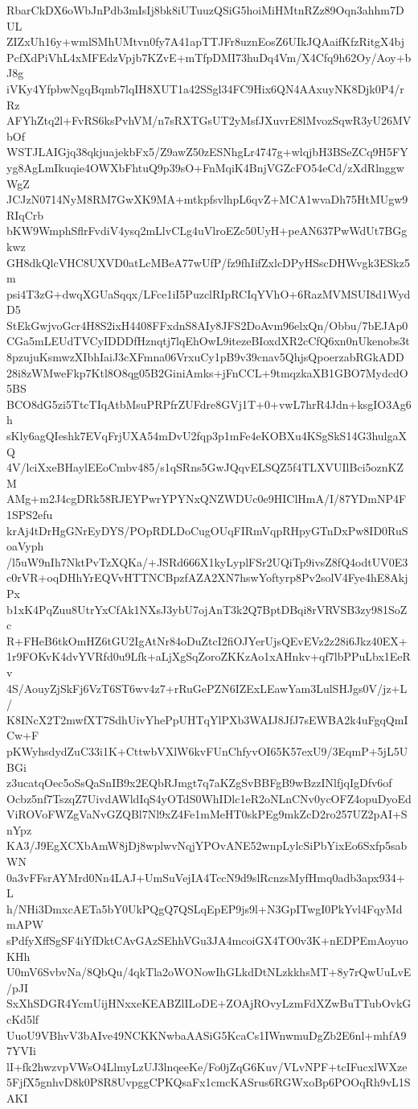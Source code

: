 RbarCkDX6oWbJnPdb3mIsIj8bk8iUTuuzQSiG5hoiMiHMtnRZz89Oqn3ahhm7DUL
ZIZxUh16y+wmlSMhUMtvn0fy7A41apTTJFr8uznEosZ6UIkJQAaifKfzRitgX4bj
PcfXdPiVhL4xMFEdzVpjb7KZvE+mTfpDMI73huDq4Vm/X4Cfq9h62Oy/Aoy+bJ8g
iVKy4YfpbwNgqBqmb7lqIH8XUT1a42SSgl34FC9Hix6QN4AAxuyNK8Djk0P4/rRz
AFYhZtq2l+FvRS6ksPvhVM/n7sRXTGsUT2yMsfJXuvrE8lMvozSqwR3yU26MVbOf
WSTJLAIGjq38qkjuajekbFx5/Z9awZ50zESNhgLr4747g+wlqjbH3BSeZCq9H5FY
yg8AgLmIkuqie4OWXbFhtuQ9p39sO+FnMqiK4BnjVGZcFO54eCd/zXdRlnggwWgZ
JCJzN0714NyM8RM7GwXK9MA+mtkpfsvlhpL6qvZ+MCA1wvaDh75HtMUgw9RIqCrb
bKW9WmphSflrFvdiV4ysq2mLlvCLg4uVlroEZc50UyH+peAN637PwWdUt7BGgkwz
GH8dkQlcVHC8UXVD0atLcMBeA77wUfP/fz9fhIifZxlcDPyHSscDHWvgk3ESkz5m
psi4T3zG+dwqXGUaSqqx/LFce1iI5PuzclRIpRCIqYVhO+6RazMVMSUI8d1WydD5
StEkGwjvoGcr4H8S2ixH4408FFxdnS8AIy8JFS2DoAvm96elxQn/Obbu/7bEJAp0
CGa5mLEUdTVCyIDDDfHznqtj7lqEhOwL9itezeBIoxdXR2cCfQ6xn0nUkenobs3t
8pzujuKsmwzXIbhIaiJ3cXFmna06VrxuCy1pB9v39cnav5QhjsQpoerzabRGkADD
28i8zWMweFkp7Ktl8O8qg05B2GiniAmks+jFnCCL+9tmqzkaXB1GBO7MydcdO5BS
BCO8dG5zi5TtcTIqAtbMsuPRPfrZUFdre8GVj1T+0+vwL7hrR4Jdn+ksgIO3Ag6h
sKly6agQIeshk7EVqFrjUXA54mDvU2fqp3p1mFe4eKOBXu4KSgSkS14G3hulgaXQ
4V/lciXxeBHaylEEoCmbv485/s1qSRns5GwJQqvELSQZ5f4TLXVUIlBci5oznKZM
AMg+m2J4cgDRk58RJEYPwrYPYNxQNZWDUc0e9HIClHmA/I/87YDmNP4F1SPS2efu
krAj4tDrHgGNrEyDYS/POpRDLDoCugOUqFIRmVqpRHpyGTnDxPw8ID0RuSoaVyph
/l5uW9nIh7NktPvTzXQKa/+JSRd666X1kyLyplFSr2UQiTp9ivsZ8fQ4odtUV0E3
c0rVR+oqDHhYrEQVvHTTNCBpzfAZA2XN7hswYoftyrp8Pv2solV4Fye4hE8AkjPx
b1xK4PqZuu8UtrYxCfAk1NXsJ3ybU7ojAnT3k2Q7BptDBqi8rVRVSB3zy981SoZc
R+FHeB6tkOmHZ6tGU2IgAtNr84oDuZtcI2fiOJYerUjsQEvEVz2z28i6Jkz40EX+
1r9FOKvK4dvYVRfd0u9Lfk+aLjXgSqZoroZKKzAo1xAHnkv+qf7lbPPuLbx1EeRv
4S/AouyZjSkFj6VzT6ST6wv4z7+rRuGePZN6IZExLEawYam3LulSHJgs0V/jz+L/
K8INcX2T2mwfXT7SdhUivYhePpUHTqYlPXb3WAIJ8JfJ7sEWBA2k4uFgqQmICw+F
pKWyhsdydZuC33i1K+CttwbVXlW6kvFUnChfyvOI65K57exU9/3EqmP+5jL5UBGi
z3ucatqOec5oSsQaSnIB9x2EQbRJmgt7q7aKZgSvBBFgB9wBzzINlfjqIgDfv6of
Ocbz5nf7TszqZ7UivdAWldIqS4yOTdS0WhIDlc1eR2oNLnCNv0ycOFZ4opuDyoEd
ViROVoFWZgVaNvGZQBl7Nl9xZ4Fe1mMeHT0skPEg9mkZcD2ro257UZ2pAI+SnYpz
KA3/J9EgXCXbAmW8jDj8wplwvNqjYPOvANE52wnpLylcSiPbYixEo6Sxfp5sabWN
0a3vFFsrAYMrd0Nn4LAJ+UmSuVejIA4TccN9d9slRcnzsMyfHmq0adb3apx934+L
h/NHi3DmxcAETa5bY0UkPQgQ7QSLqEpEP9js9l+N3GpITwgI0PkYvl4FqyMdmAPW
sPdfyXffSgSF4iYfDktCAvGAzSEhhVGu3JA4mcoiGX4TO0v3K+nEDPEmAoyuoKHh
U0mV6SvbvNa/8QbQu/4qkTla2oWONowIhGLkdDtNLzkkhsMT+8y7rQwUuLvE/pJI
SxXhSDGR4YcmUijHNxxeKEABZlILoDE+ZOAjROvyLzmFdXZwBuTTubOvkGcKd5lf
UuoU9VBhvV3bAIve49NCKKNwbaAASiG5KcaCs1IWnwmuDgZb2E6nl+mhfA97YVIi
lI+fk2hwzvpVWsO4LlmyLzUJ3lnqeeKe/Fo0jZqG6Kuv/VLvNPF+tcIFucxlWXze
5FjfX5gnhvD8k0P8R8UvpggCPKQsaFx1cmcKASrus6RGWxoBp6POOqRh9vL1SAKI
